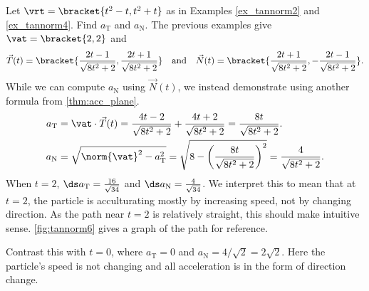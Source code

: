 \begin{example}\label{ex_tannorm6}
Let $\vrt=\bracket{t^2-t,t^2+t}$ as in Examples \ref{ex_tannorm2} and \ref{ex_tannorm4}. Find $a_\mathrm{T}$ and $a_\mathrm{N}$.
\solution
The previous examples give $\vat =\bracket{2,2}$ and
\[\vec T(t) =\bracket{\frac{2t-1}{\sqrt{8t^2+2}},\frac{2t+1}{\sqrt{8t^2+2}}}\quad \text{and}\quad \vec N(t) =\bracket{\frac{2t+1}{\sqrt{8t^2+2}},-\frac{2t-1}{\sqrt{8t^2+2}}}.\]
While we can compute $a_\mathrm{N}$ using $\vec N(t)$, we instead demonstrate using another formula from \autoref{thm:acc_plane}.
\begin{align*}
a_\mathrm{T} &= \vat\cdot\vec T(t) = \frac{4t-2}{\sqrt{8t^2+2}}+\frac{4t+2}{\sqrt{8t^2+2}} = \frac{8t}{\sqrt{8t^2+2}}.\\
a_\mathrm{N} &= \sqrt{\norm{\vat}^2-a_\mathrm{T}^2} = \sqrt{8-\left(\frac{8t}{\sqrt{8t^2+2}}\right)^2}=\frac{4}{\sqrt{8t^2+2}}.\medskip
\end{align*}
When $t=2$, $\ds a_{\mathrm{T}} = \frac{16}{\sqrt{34}}%
$ and $\ds a_{\mathrm{N}} = \frac{4}{\sqrt{34}}%
$. We interpret this to mean that at $t=2$, the particle is acculturating mostly by increasing speed, not by changing direction. As the path near $t=2$ is relatively straight, this should make intuitive sense. \autoref{fig:tannorm6} gives a graph of the path for reference.

Contrast this with $t=0$, where $a_{\mathrm{T}}=0$ and $a_{\mathrm{N}}=4/\sqrt2=2\sqrt2 %
$. Here the particle's speed is not changing and all acceleration is in the form of direction change.
\end{example}

